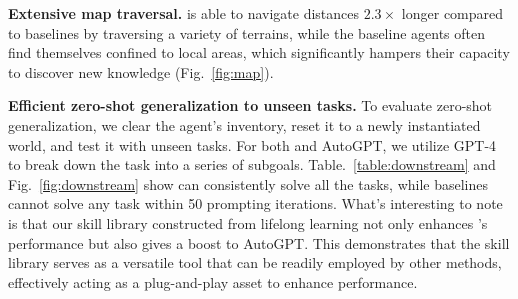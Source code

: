 \textbf{Extensive map traversal.} \voyager is able to navigate distances $2.3 \times$ longer compared to baselines by traversing a variety of terrains, while the baseline agents often find themselves confined to local areas, which significantly hampers their capacity to discover new knowledge (Fig.~\ref{fig:map}).




\textbf{Efficient zero-shot generalization to unseen tasks.}
To evaluate zero-shot generalization, we clear the agent's inventory, reset it to a newly instantiated world, and test it with unseen tasks.
For both \voyager and AutoGPT, we utilize GPT-4 to break down the task into a series of subgoals.
Table.~\ref{table:downstream} and Fig.~\ref{fig:downstream} show \voyager can consistently solve all the tasks, while baselines cannot solve any task within 50 prompting iterations. What's interesting to note is that our skill library constructed from lifelong learning not only enhances \voyager's performance but also gives a boost to AutoGPT. This demonstrates that the skill library serves as a versatile tool that can be readily employed by other methods, effectively acting as a plug-and-play asset to enhance performance.



